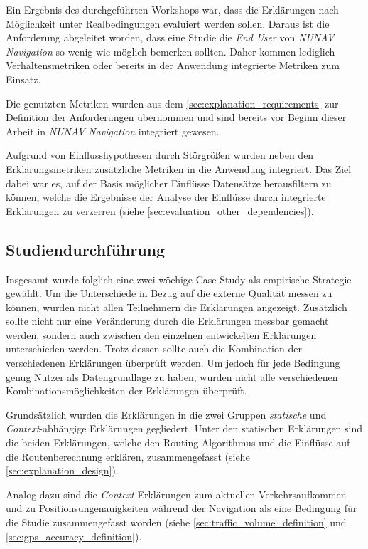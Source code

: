 Ein Ergebnis des durchgeführten Workshops war, dass die Erklärungen nach Möglichkeit unter Realbedingungen evaluiert werden sollen. Daraus ist die Anforderung abgeleitet worden, dass eine Studie die \textit{End User} von \textit{NUNAV Navigation} so wenig wie möglich bemerken sollten. Daher kommen lediglich Verhaltensmetriken oder bereits in der Anwendung integrierte Metriken zum Einsatz.

Die genutzten Metriken wurden aus dem \autoref{sec:explanation_requirements} zur Definition der Anforderungen übernommen und sind bereits vor Beginn dieser Arbeit in \textit{NUNAV Navigation} integriert gewesen.

Aufgrund von Einflusshypothesen durch Störgrößen wurden neben den Erklärungsmetriken zusätzliche Metriken in die Anwendung integriert. Das Ziel dabei war es, auf der Basis möglicher Einflüsse Datensätze herausfiltern zu können, welche die Ergebnisse der Analyse der Einflüsse durch integrierte Erklärungen zu verzerren (siehe \autoref{sec:evaluation_other_dependencies}).

\subsection{Studiendurchführung}

Insgesamt wurde folglich eine zwei-wöchige Case Study als empirische Strategie gewählt. Um die Unterschiede in Bezug auf die externe Qualität messen zu können, wurden nicht allen Teilnehmern die Erklärungen angezeigt. Zusätzlich sollte nicht nur eine Veränderung durch die Erklärungen messbar gemacht werden, sondern auch zwischen den einzelnen entwickelten Erklärungen unterschieden werden. Trotz dessen sollte auch die Kombination der verschiedenen Erklärungen überprüft werden. Um jedoch für jede Bedingung genug Nutzer als Datengrundlage zu haben, wurden nicht alle verschiedenen Kombinationsmöglichkeiten der Erklärungen überprüft.

Grundsätzlich wurden die Erklärungen in die zwei Gruppen \textit{statische} und \textit{Context}-abhängige Erklärungen gegliedert. Unter den statischen Erklärungen sind die beiden Erklärungen, welche den Routing-Algorithmus und die Einflüsse auf die Routenberechnung erklären, zusammengefasst (siehe \autoref{sec:explanation_design}).

Analog dazu sind die \textit{Context}-Erklärungen zum aktuellen Verkehrsaufkommen und zu Positionsungenauigkeiten während der Navigation als eine Bedingung für die Studie zusammengefasst worden (siehe \autoref{sec:traffic_volume_definition} und \autoref{sec:gps_accuracy_definition}).

